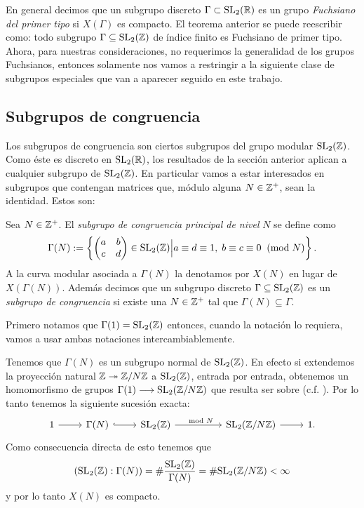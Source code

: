 \documentclass[../../tesis_maestria]{subfiles}
\begin{document}
En general decimos que un subgrupo discreto $\Gamma\subset\mathrm{SL}_2(\mathbb{R})$ es un grupo
\emph{Fuchsiano del primer tipo} si $X(\Gamma)$ es compacto. El teorema anterior se puede reescribir
como: todo subgrupo $\Gamma\subseteq\mathrm{SL}_2(\mathbb{Z})$ de \'indice finito es Fuchsiano de primer tipo.
Ahora, para nuestras consideraciones, no requerimos la generalidad de los grupos Fuchsianos, entonces
solamente nos vamos a restringir a la siguiente clase de subgrupos especiales que van a aparecer
seguido en este trabajo.

\subsection{Subgrupos de congruencia}\label{sec:subgruposdecongruencia}%

Los subgrupos de congruencia son ciertos subgrupos del grupo modular $\mathrm{SL}_2(\mathbb{Z})$. Como \'este
es discreto en $\mathrm{SL}_2(\mathbb{R})$, los resultados de la secci\'on anterior aplican a cualquier subgrupo
de $\mathrm{SL}_2(\mathbb{Z})$. En particular vamos a estar interesados en subgrupos que contengan matrices que,
m\'odulo alguna $N\in\mathbb{Z}^+$, sean la identidad. Estos son:

\begin{defin}
  Sea $N\in\mathbb{Z}^+$. El \emph{subgrupo de congruencia principal de nivel} $N$ se define como
  \[
    \Gamma(N):=
    \left\{ \begin{pmatrix}a & b\\ c & d\end{pmatrix}\in\mathrm{SL}_2(\mathbb{Z})\Big| a\equiv d\equiv 1,\; b\equiv c\equiv 0\;\;(\mathrm{mod}\; N)\right\}.
  \]
  A la curva modular asociada a $\Gamma(N)$ la denotamos por $X(N)$ en lugar de $X(\Gamma(N))$.
  Adem\'as decimos que un subgrupo discreto $\Gamma\subseteq\mathrm{SL}_2(\mathbb{Z})$ es un \emph{subgrupo de
    congruencia} si existe una $N\in\mathbb{Z}^+$ tal que $\Gamma(N)\subseteq\Gamma$.
\end{defin}


Primero notamos que $\Gamma(1)=\mathrm{SL}_2(\mathbb{Z})$ entonces, cuando la notaci\'on lo requiera, vamos a
usar ambas notaciones intercambiablemente.

Tenemos que $\Gamma(N)$ es un subgrupo normal de $\mathrm{SL}_2(\mathbb{Z})$. En efecto si extendemos la
proyecci\'on natural $\mathbb{Z}\twoheadrightarrow\mathbb{Z}/N\mathbb{Z}$ a $\mathrm{SL}_2(\mathbb{Z})$, entrada por entrada, obtenemos un
homomorfismo de grupos $\Gamma(1)\longrightarrow\mathrm{SL}_2(\mathbb{Z}/N\mathbb{Z})$ que resulta ser sobre (c.f.
\cite[\S1.6, lema 1.38]{ShimuraITTATOAF}). Por lo tanto tenemos la siguiente sucesi\'on
exacta:
\[
  \begin{tikzcd}
    1 \arrow[r] & \Gamma(N) \arrow[r,hookrightarrow] & \SL_2(\ZZ) \arrow[rr,"\mod N"] &&
    \SL_2(\ZZ/N\ZZ) \arrow[r] & 1.
  \end{tikzcd}
\]
Como consecuencia directa de esto tenemos que
\[
  (\mathrm{SL}_2(\mathbb{Z}):\Gamma(N))=\#\frac{\mathrm{SL}_2(\mathbb{Z})}{\Gamma(N)}=\#\mathrm{SL}_2(\mathbb{Z}/N\mathbb{Z})<\infty
\]
y por lo tanto $X(N)$ es compacto.
\end{document}

